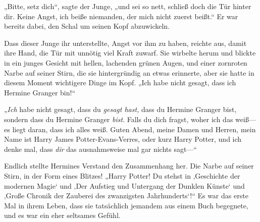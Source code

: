 „Bitte, setz dich“, sagte der Junge, „und sei so nett, schließ doch die Tür hinter dir. Keine Angst, ich beiße niemanden, der mich nicht zuerst beißt.“ Er war bereits dabei, den Schal um seinen Kopf abzuwickeln.

Dass dieser Junge ihr unterstellte, Angst vor ihm zu haben, reichte aus, damit ihre Hand, die Tür mit unnötig viel Kraft zuwarf. Sie wirbelte herum und blickte in ein junges Gesicht mit hellen, lachenden grünen Augen, und einer zornroten Narbe auf seiner Stirn, die sie hintergründig an etwas erinnerte, aber sie hatte in diesem Moment wichtigere Dinge im Kopf. „Ich habe nicht gesagt, dass ich Hermine Granger bin!“

„\emph{Ich} habe nicht gesagt, dass du \emph{gesagt hast,} dass du Hermine Granger bist, sondern dass du Hermine Granger \emph{bist}. Falls du dich fragst, woher ich das weiß—es liegt daran, dass ich alles weiß. Guten Abend, meine Damen und Herren, mein Name ist Harry James Potter-Evans-Verres, oder kurz Harry Potter, und ich denke mal, dass \emph{dir} das ausnahmsweise mal gar nichts sagt—“

Endlich stellte Hermines Verstand den Zusammenhang her. Die Narbe auf seiner Stirn, in der Form eines Blitzes! „Harry Potter! Du stehst in ‚Geschichte der modernen Magie‘ und ‚Der Aufstieg und Untergang der Dunklen Künste‘ und ‚Große Chronik der Zauberei des zwanzigsten Jahrhunderts‘!“ Es war das erste Mal in ihrem Leben, dass sie tatsächlich jemandem aus einem Buch begegnete, und es war ein eher seltsames Gefühl.

